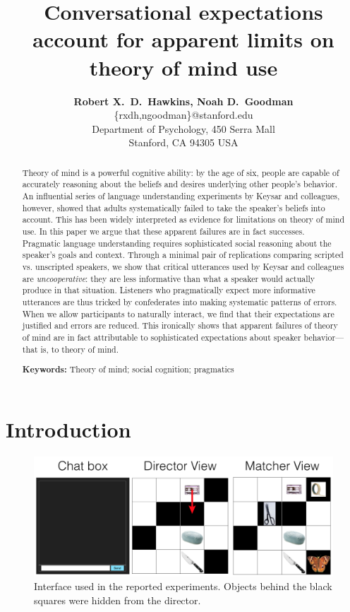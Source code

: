 \documentclass[10pt,letterpaper]{article}
\title{Conversational expectations account for apparent limits on theory of mind use}
\author{{\large \bf Robert X.~D.~Hawkins, Noah D.~Goodman}\\
  \{rxdh,ngoodman\}@stanford.edu\\
  Department of Psychology, 450 Serra Mall \\
  Stanford, CA 94305 USA}
\begin{document}
\maketitle

\begin{abstract}
Theory of mind is a powerful cognitive ability: by the age of six, people are capable of accurately reasoning about the beliefs and desires underlying other people's behavior. An influential series of language understanding experiments by Keysar and colleagues, however, showed that adults systematically failed to take the speaker's beliefs into account. This has been widely interpreted as evidence for limitations on theory of mind use. In this paper we argue that these apparent failures are in fact successes. Pragmatic language understanding requires sophisticated social reasoning about the speaker's goals and context. Through a minimal pair of replications comparing scripted vs. unscripted speakers, we show that critical utterances used by Keysar and colleagues are \emph{uncooperative}: they are less informative than what a speaker would actually produce in that situation. Listeners who pragmatically expect more informative utterances are thus tricked by confederates into making systematic patterns of errors. When we allow participants to naturally interact, we find that their expectations are justified and errors are reduced. This ironically shows that apparent failures of theory of mind are in fact attributable to sophisticated expectations about speaker behavior---that is, to theory of mind.

\textbf{Keywords:} 
Theory of mind; social cognition; pragmatics
\end{abstract}

\section{Introduction}
\label{sec:intro}

\begin{figure}[bt!]
\begin{center}
\includegraphics[scale = .45]{images/overall_view.png}
\end{center}
\vspace{-.25cm}
\caption{Interface used in the reported experiments. Objects behind the black squares were hidden from the director.}
\label{fig:interface}
\end{figure}
\end{document}
